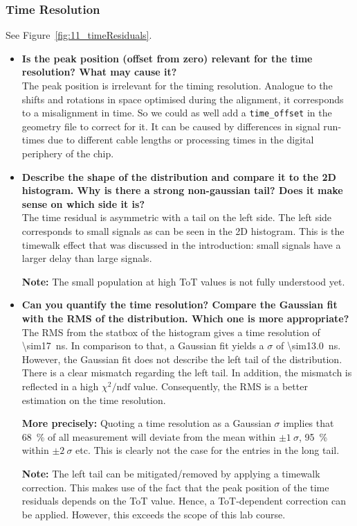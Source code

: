 \documentclass[a4paper,11pt]{article}
\newcommand*{\code}[1]{\texttt{#1}}
\begin{document}
\subsubsection{Time Resolution}
See Figure~\ref{fig:11_timeResiduals}.
\begin{itemize}
\item \textbf{Is the peak position (offset from zero) relevant for the time resolution? What may cause it?}\\
The peak position is irrelevant for the timing resolution.
Analogue to the shifts and rotations in space optimised during the alignment, it corresponds to a misalignment in time.
So we could as well add a \code{time\_offset} in the geometry file to correct for it.
It can be caused by differences in signal run-times due to different cable lengths or processing times in the digital periphery of the chip.
\item \textbf{Describe the shape of the distribution and compare it to the 2D histogram. Why is there a strong non-gaussian tail? Does it make sense on which side it is?}\\
The time residual is asymmetric with a tail on the left side.
The left side corresponds to small signals as can be seen in the 2D histogram.
This is the timewalk effect that was discussed in the introduction: small signals have a larger delay than large signals.

\textbf{Note:} The small population at high ToT values is not fully understood yet.
\item \textbf{Can you quantify the time resolution? Compare the Gaussian fit with the RMS of the distribution. Which one is more appropriate?}
The RMS from the statbox of the histogram gives a time resolution of \SI{\sim17}{ns}. In comparison to that, a Gaussian fit yields a $\sigma$ of \SI{\sim13.0}{ns}.
However, the Gaussian fit does not describe the left tail of the distribution.
There is a clear mismatch regarding the left tail.
In addition, the mismatch is reflected in a high $\chi^2/\text{ndf}$ value.
Consequently, the RMS is a better estimation on the time resolution.

\textbf{More precisely:} Quoting a time resolution as a Gaussian $\sigma$ implies that \SI{68}{\percent} of all measurement will deviate from the mean within $\pm1~\sigma$, \SI{95}{\percent} within $\pm2~\sigma$ etc.
This is clearly not the case for the entries in the long tail.

\textbf{Note:} The left tail can be mitigated/removed by applying a timewalk correction.
This makes use of the fact that the peak position of the time residuals depends on the ToT value. 
Hence, a ToT-dependent correction can be applied.
However, this exceeds the scope of this lab course.
\end{itemize}
\end{document}
